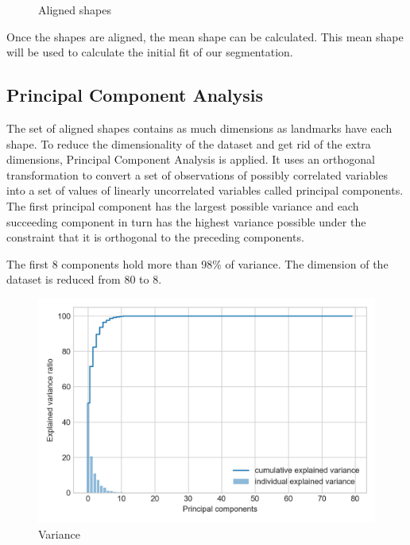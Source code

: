 \begin{figure}[!htb]
\begin{minipage}{0.49\textwidth}
  \caption{Aligned shapes}
 \end{minipage}
\end{figure}

Once the shapes are aligned, the mean shape can be calculated.
This mean shape will be used to calculate the initial fit of
our segmentation.

\subsection{Principal Component Analysis}
The set of aligned shapes contains as much dimensions as landmarks
have each shape. To reduce the dimensionality of the dataset and
get rid of the extra dimensions, Principal Component Analysis is
applied. It uses an orthogonal transformation to convert a set of
observations of possibly correlated variables into a set of values
of linearly uncorrelated variables called principal components.
The first principal component has the largest possible variance
and each succeeding component in turn has the highest variance
possible under the constraint that it is orthogonal to the
preceding components.

The first 8 components hold more than 98\% of variance. The
dimension of the dataset is reduced from 80 to 8.

\begin{figure}[h]
  \centering
  \includegraphics[width=0.7\linewidth]{img/variance}
  \caption{Variance}
\end{figure}
